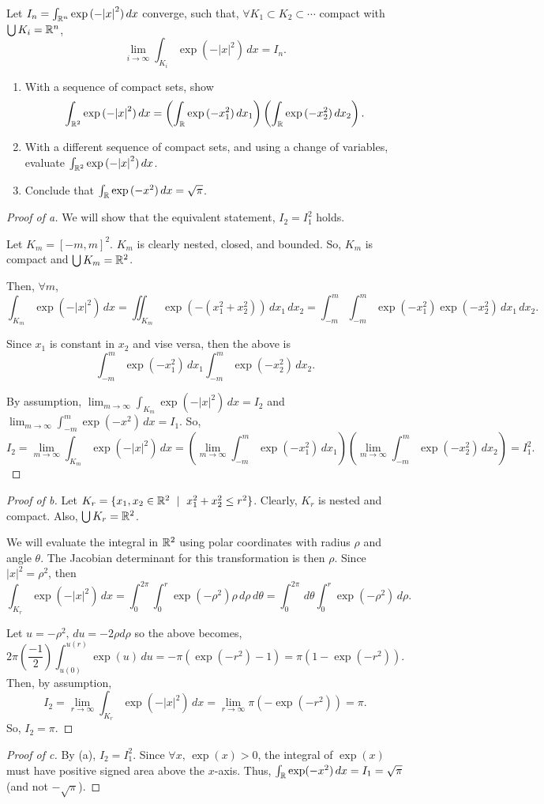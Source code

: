 \documentclass[../hw8]{subfiles}
\begin{document}
\begin{problem}[1]
Let $I_n = \int_{\mathbb{R}^{n}}\exp{(- {|x|}^2)}\,dx$ converge,
such that, $\forall K_1\subset K_2\subset \cdots$ compact with $\bigcup K_i = \mathbb{R}^{n}$, \[
	\lim_{i \to \infty} \int_{K_i} \exp{(- {|x|}^2)} \,dx = I_n
	.\]
\begin{enumerate}[label=(\alph*)]
	\item With a sequence of compact sets, show \[
		      \int_{\mathbb{R}^2}\exp{( - {|x|}^2)}\,dx = \left( \int_{\mathbb{R}} \exp{(-x_1^2)} \,dx_1 \right) \left( \int_{\mathbb{R}} \exp{(-x_2^2)} \,dx_2 \right)
		      .\]
	\item With a different sequence of compact sets, and using a change of variables, evaluate $\int_{\mathbb{R}^2} \exp{(- {|x|}^2)} \,dx$.
	\item Conclude that $\int_{\mathbb{R}} \exp{(-x^2)} \,dx = \sqrt{\pi}$.
\end{enumerate}
\end{problem}
\begin{proof}[Proof of a]
	We will show that the equivalent statement, $I_2=I_1^2$ holds.

	Let $K_m={[-m,m]}^2$. $K_m$ is clearly nested, closed, and bounded.
	So,  $K_m$ is compact and $\bigcup K_m = \mathbb{R}^2$.

	Then, $\forall m$,  \[
		\int_{K_m}\exp{(-{|x|}^2)}\,dx=\iint_{K_m}\exp{(-(x_1^2 + x_2^2))}\,dx_1\,dx_2 = \int_{-m}^{m} \int_{-m}^{m} \exp(-x_1^2)\exp(-x_2^2)  \,dx_1\,dx_2
		.\]

	Since $x_1$ is constant in $x_2$ and vise versa, then the above is \[
		\int_{-m}^{m} \exp(-x_1^2) \,dx_1
		\int_{-m}^{m} \exp(-x_2^2) \,dx_2
		.\]

	By assumption, $\lim_{m \to \infty} \int_{K_m}\exp(-{|x|}^2)\,dx=I_2$ and $\lim_{m \to \infty} \int_{-m}^m \exp(-x^2)\,dx=I_1$.
	So,\[
		I_2 = \lim_{m \to \infty} \int_{K_m}\exp(-{|x|}^2)\,dx =
		\left( \lim_{m \to \infty} \int_{-m}^m \exp(-x_1^2)\,dx_1 \right)
		\left( \lim_{m \to \infty} \int_{-m}^m \exp(-x_2^2)\,dx_2 \right) = I_1^2
		.\]
\end{proof}
\begin{proof}[Proof of b]
	Let $K_r = \{x_1,x_2\in \mathbb{R}^2\ \mid\ x_1^2 + x_2^2\le r^2\} $. Clearly, $K_r$ is nested and compact.
	Also, $\bigcup K_r = \mathbb{R}^2$.

	We will evaluate the integral in $\mathbb{R}^2$ using polar coordinates with radius $\rho$ and angle $\theta$.
	The Jacobian determinant for this transformation is then $\rho$.
	Since ${|x|}^2=\rho^2$, then \[
		\int_{K_r}\exp(-{|x|}^2)\,dx
		= \int_{0}^{2\pi}\int_{0}^{r} \exp(-\rho^2)\rho \,d\rho  \,d\theta
		= \int_{0}^{2\pi}\,d\theta \int_{0}^{r} \exp(-\rho^2) \,d\rho
		.\]

	Let $u=-\rho^2,\, du=-2\rho d\rho$ so the above becomes, \[
		2\pi\left( \frac{-1}{2} \right) \int_{u(0)}^{u(r)} \exp(u) \,du
		= -\pi(\exp{(-r^2)}-1)
		= \pi(1-\exp{(-r^2)})
		.\]
	Then, by assumption, \[
		I_2=\lim_{r \to \infty} \int_{K_r} \exp(-{|x|}^2) \,dx
		=\lim_{r \to \infty} \pi(-\exp(-r^2)) =\pi
		.\]
	So, $I_2=\pi$.
\end{proof}
\begin{proof}[Proof of c]
	By (a), $I_2=I_1^2$.
	Since $\forall x,\, \exp(x)>0$, the integral of $\exp(x)$ must have positive signed area above the $x$-axis.
	Thus, $\int_{\mathbb{R}}\exp(-x^2)\,dx=I_1=\sqrt{\pi}$ (and not $-\sqrt{\pi}$).
\end{proof}
\end{document}
